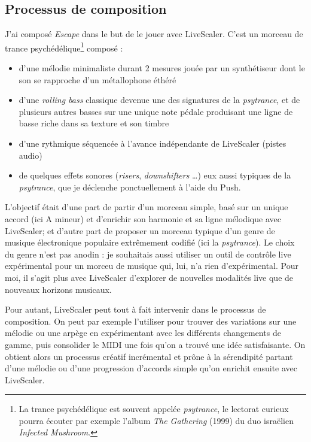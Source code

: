 \subsection{Processus de composition}

J'ai composé \emph{Escape} dans le but de le jouer avec LiveScaler. C'est un morceau de trance psychédélique\footnote{La trance psychédélique est souvent  appelée \emph{psytrance}, le lectorat curieux pourra écouter par exemple l'album \emph{The Gathering} (1999) du duo israëlien \emph{Infected Mushroom}.} composé  : 
\begin{itemize}
  \item d'une mélodie minimaliste durant 2 mesures jouée par un synthétiseur  dont le son se rapproche d'un métallophone éthéré
  \item d'une \emph{rolling bass} classique devenue une des signatures de la \emph{psytrance}, et de plusieurs autres basses sur une unique note pédale produisant une ligne de basse riche dans sa texture et son timbre
  \item d'une rythmique séquencée à l'avance indépendante de LiveScaler (pistes audio)
  \item de quelques effets sonores (\emph{risers}, \emph{downshifters} \dots) eux aussi typiques de la \emph{psytrance}, que je déclenche ponctuellement à l'aide du Push.
\end{itemize}

L'objectif était d'une part de partir d'un morceau simple, basé sur un unique accord (ici A mineur) et d'enrichir son harmonie et sa ligne mélodique avec LiveScaler; et d'autre part de proposer un morceau typique d'un genre de musique électronique populaire extrêmement codifié (ici la \emph{psytrance}). Le choix du genre n'est pas anodin :  je souhaitais aussi utiliser un outil de contrôle live expérimental pour un morceu de musique qui, lui, n'a rien d'expérimental. Pour moi, il s'agit plus avec LiveScaler d'explorer de nouvelles modalités live que de nouveaux horizons musicaux.

Pour autant, LiveScaler peut tout à fait intervenir dans le processus de composition. On peut par exemple l'utiliser pour trouver des variations sur une mélodie ou une arpège en expérimentant avec les différents changements de gamme, puis consolider le MIDI une fois qu'on a trouvé une idée satisfaisante. On obtient alors un processus créatif incrémental et prône à la sérendipité partant d'une mélodie ou d'une progression d'accords simple qu'on enrichit ensuite avec LiveScaler.
